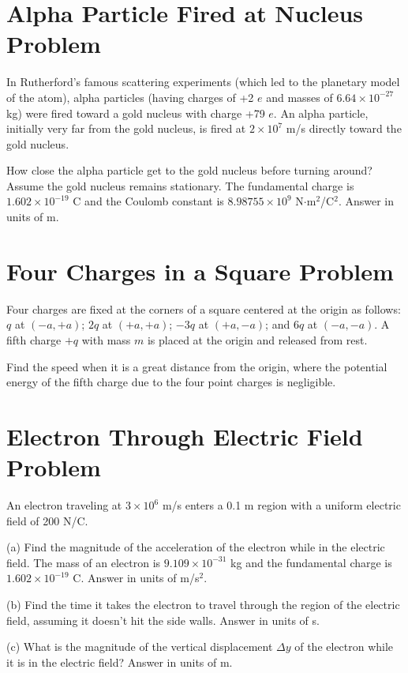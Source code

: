 \documentclass[../physics12.tex]{subfiles}
\begin{document}
\section{Alpha Particle Fired at Nucleus Problem}
In Rutherford's famous scattering experiments (which led to the planetary model of the atom), alpha particles (having charges of +2 $e$ and masses of $6.64\times 10^{-27}$ kg) were 
fired toward a gold nucleus with charge +79 $e$. An alpha particle, initially very far from the gold nucleus, is fired at $2\times 10^7$ m/s directly toward the gold nucleus.

How close the alpha particle get to the gold nucleus before turning around? Assume the gold nucleus remains stationary. The fundamental charge is $1.602\times 10^{-19}$ C and 
the Coulomb constant is $8.98755\times 10^9$ N$\cdot$m$^2$/C$^2$. Answer in units of m.

\section{Four Charges in a Square Problem}
Four charges are fixed at the corners of a square centered at the origin as follows: $q$ at $(-a, +a)$; $2q$ at $(+a, +a)$; $-3q$ at $(+a,-a)$; 
and $6q$ at $(-a,-a)$. A fifth charge $+q$ with mass $m$ is placed at the origin and released from rest.

Find the speed when it is a great distance from the origin, where the potential energy of the fifth charge due to the four point charges is negligible.

\section{Electron Through Electric Field Problem}
An electron traveling at $3\times 10^6$ m/s enters a 0.1 m region with a uniform electric field of 200 N/C. 

(a) Find the magnitude of the acceleration of the electron while in the electric field. The mass of an electron is $9.109\times 10^{-31}$ kg and the 
fundamental charge is $1.602\times 10^{-19}$ C. Answer in units of m/s$^2$.

(b) Find the time it takes the electron to travel through the region of the electric field, assuming it doesn't hit the side walls. Answer in units of s.

(c) What is the magnitude of the vertical displacement $\Delta y$ of the electron while it is in the electric field? Answer in units of m.
\end{document}
